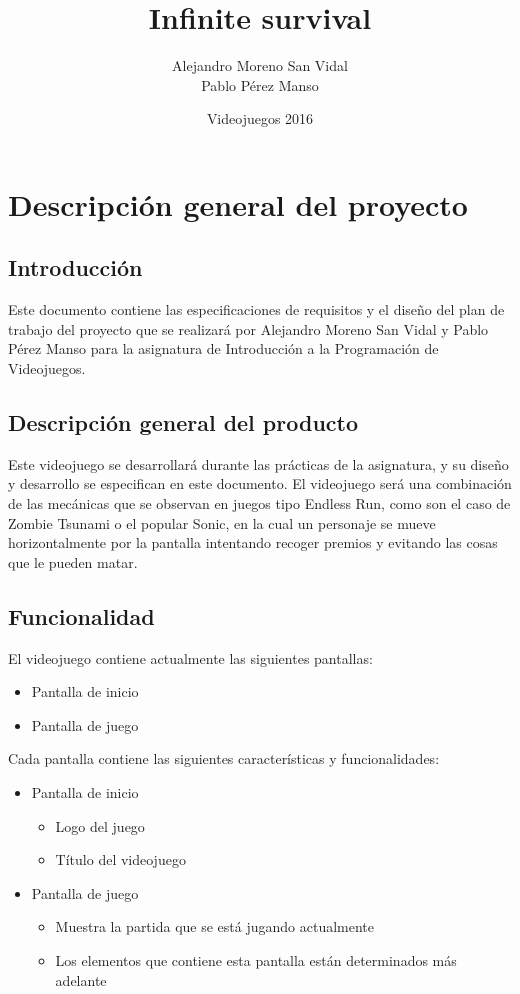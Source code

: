 \documentclass[palatino]{apuntes}
\title{Infinite survival}
\author{Alejandro Moreno San Vidal \\ Pablo Pérez Manso}
\date{Videojuegos 2016}
\begin{document}
\pagestyle{plain}
\maketitle
\tableofcontents
\newpage

\chapter{Descripción general del proyecto}

\section{Introducción}
Este documento contiene las especificaciones de requisitos y el diseño del plan de trabajo del proyecto que se realizará por Alejandro Moreno San Vidal y Pablo Pérez Manso para la asignatura de Introducción a la Programación de Videojuegos.

\section{Descripción general del producto}
Este videojuego se desarrollará durante las prácticas de la asignatura, y su diseño y desarrollo se especifican en este documento. El videojuego será una combinación de las mecánicas que se observan en juegos tipo Endless Run, como son el caso de Zombie Tsunami o el popular Sonic, en la cual un personaje se mueve horizontalmente por la pantalla intentando recoger premios y evitando las cosas que le pueden matar.

\section{Funcionalidad}

El videojuego contiene actualmente las siguientes pantallas:
\begin{itemize}
    \item Pantalla de inicio
    \item Pantalla de juego
  
\end{itemize}

Cada pantalla contiene las siguientes características y funcionalidades:
\begin{itemize}
    \item Pantalla de inicio
        \begin{itemize}
            \item Logo del juego
            \item Título del videojuego
        \end{itemize}
   
    \item Pantalla de juego
        \begin{itemize}
            \item Muestra la partida que se está jugando actualmente
            \item Los elementos que contiene esta pantalla están determinados más adelante
        \end{itemize}
    
\end{itemize}
\end{document}
